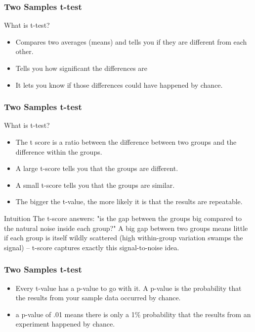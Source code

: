 \begin{frame}[fragile]\frametitle{Two Samples t-test}
What is t-test?
\begin{itemize}
\item Compares two averages (means) and tells you if they are different from each other. 
\item Tells you how significant the differences are
\item It lets you know if those differences could have happened by chance.
\end{itemize}
\end{frame}

\begin{frame}[fragile]\frametitle{Two Samples t-test}
What is t-test?
\begin{itemize}
\item The t score is a ratio between the difference between two groups and the difference within the groups.
\item A large t-score tells you that the groups are different.
\item A small t-score tells you that the groups are similar.
\item  The bigger the t-value, the more likely it is that the results are repeatable.
\end{itemize}

\begin{block}{Intuition}
The t-score answers: "is the gap between the groups big compared to the natural noise inside each group?" A big gap between two groups means little if each group is itself wildly scattered (high within-group variation swamps the signal) -- t-score captures exactly this signal-to-noise idea.
\end{block}
\end{frame}

\begin{frame}[fragile]\frametitle{Two Samples t-test}
\begin{itemize}
\item Every t-value has a p-value to go with it. A p-value is the probability that the results from your sample data occurred by chance. 
\item a p-value of .01 means there is only a 1\% probability that the results from an experiment happened by chance.
\end{itemize}
\end{frame}

